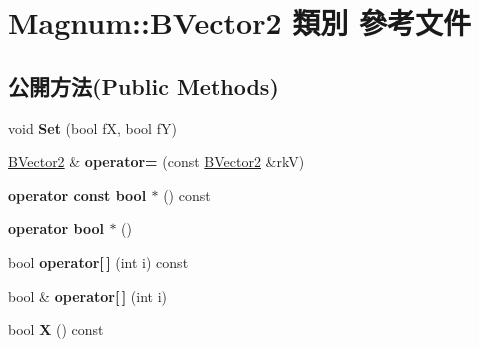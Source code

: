 \hypertarget{class_magnum_1_1_b_vector2}{}\section{Magnum\+:\+:B\+Vector2 類別 參考文件}
\label{class_magnum_1_1_b_vector2}
\subsection*{公開方法(Public Methods)}
\begin{DoxyCompactItemize}
\item 
void {\bfseries Set} (bool fX, bool fY)\hypertarget{class_magnum_1_1_b_vector2_a5d9258bbdf9efe742dc9b8524910a640}{}\label{class_magnum_1_1_b_vector2_a5d9258bbdf9efe742dc9b8524910a640}

\item 
\hyperlink{class_magnum_1_1_b_vector2}{B\+Vector2} \& {\bfseries operator=} (const \hyperlink{class_magnum_1_1_b_vector2}{B\+Vector2} \&rkV)\hypertarget{class_magnum_1_1_b_vector2_a94eab483e1d4d3217e1b52c0e3b0c710}{}\label{class_magnum_1_1_b_vector2_a94eab483e1d4d3217e1b52c0e3b0c710}

\item 
{\bfseries operator const bool $\ast$} () const \hypertarget{class_magnum_1_1_b_vector2_af8da6b05161dea2c9e77b5542327b1c4}{}\label{class_magnum_1_1_b_vector2_af8da6b05161dea2c9e77b5542327b1c4}

\item 
{\bfseries operator bool $\ast$} ()\hypertarget{class_magnum_1_1_b_vector2_a3ab985b22b818bee3a047074d18f004f}{}\label{class_magnum_1_1_b_vector2_a3ab985b22b818bee3a047074d18f004f}

\item 
bool {\bfseries operator\mbox{[}$\,$\mbox{]}} (int i) const \hypertarget{class_magnum_1_1_b_vector2_a13fe316cafb14ce765d5809c317cb1d3}{}\label{class_magnum_1_1_b_vector2_a13fe316cafb14ce765d5809c317cb1d3}

\item 
bool \& {\bfseries operator\mbox{[}$\,$\mbox{]}} (int i)\hypertarget{class_magnum_1_1_b_vector2_a18c1453115edd61e53a3cba74ceca299}{}\label{class_magnum_1_1_b_vector2_a18c1453115edd61e53a3cba74ceca299}

\item 
bool {\bfseries X} () const \hypertarget{class_magnum_1_1_b_vector2_a48373c56dbbc4594c03d3df9eaf47b0f}{}\label{class_magnum_1_1_b_vector2_a48373c56dbbc4594c03d3df9eaf47b0f}


\end{DoxyCompactItemize}
